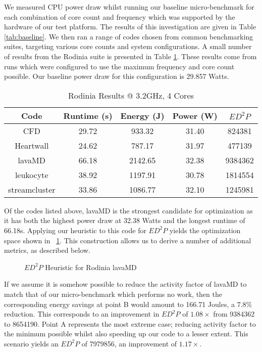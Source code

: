 We measured CPU power draw whilst running our baseline micro-benchmark for each combination of core count and frequency which was supported by the hardware of our test platform. The results of this investigation are given in Table \ref{tab:baseline}. We then ran a range of codes chosen from common benchmarking suites, targeting various core counts and system configurations. A small number of results from the Rodinia suite is presented in Table \ref{tab:coderesults}. These results come from runs which were configured to use the maximum frequency and core count possible. Our baseline power draw for this configuration is 29.857 Watts.


\begin{table}
\centering
\small
\begin{tabular}{@{}ccccc@{}} \toprule
Code & Runtime (s) & Energy (J) & Power (W) & $ED^2P$ \\ \midrule 
CFD & 29.72 & 933.32 & 31.40 & 824381  \\ 
Heartwall & 24.62 & 787.17 & 31.97 & 477139 \\ 
lavaMD & 66.18 & 2142.65 & 32.38 & 9384362\\ 
leukocyte &  38.92 & 1197.91 & 30.78 & 1814554 \\ 
streamcluster & 33.86 & 1086.77 & 32.10 & 1245981 \\ 
\bottomrule
\end{tabular}
   \vspace{0.5\baselineskip}
\caption{Rodinia Results @ 3.2GHz, 4 Cores}
\label{tab:coderesults}
\end{table} 

Of the codes listed above, lavaMD is the strongest candidate for optimization as it has both the highest power draw at 32.38 Watts and the longest runtime of 66.18s. Applying our heuristic to this code for $ED^2P$ yields the optimization space shown in \figurename~\ref{fig:lavamd}. This construction allows us to derive a number of additional metrics, as described below.


\begin{figure}

\caption{$ED^2P$ Heuristic for Rodinia lavaMD} \label{fig:lavamd}
\end{figure}

If we assume it is somehow possible to reduce the activity factor of lavaMD to match that of our  micro-benchmark which performs no work, then the corresponding energy savings at point B would amount to 166.71 Joules, a $7.8\%$ reduction. This corresponds to an improvement in $ED^2P$ of $1.08\times$ from 9384362 to 8654190. Point A represents the most extreme case; reducing activity factor to the minimum possible whilst also speeding up our code to a lesser extent. This scenario yields an $ED^2P$ of 7979856, an improvement of $1.17\times$.

